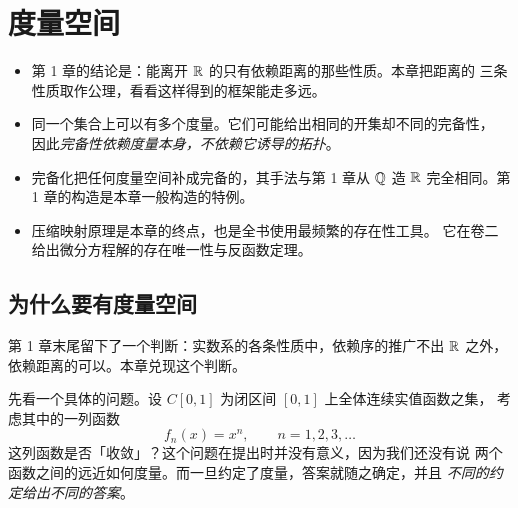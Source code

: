 \chapter{度量空间}
\label{ch:metric}

\begin{keypoint}[本章要点]
  \begin{itemize}
    \item 第 1 章的结论是：能离开 \(\mathbb{R}\) 的只有依赖距离的那些性质。本章把距离的
          三条性质取作公理，看看这样得到的框架能走多远。
    \item 同一个集合上可以有多个度量。它们可能给出相同的开集却不同的完备性，
          因此\emph{完备性依赖度量本身，不依赖它诱导的拓扑}。
    \item 完备化把任何度量空间补成完备的，其手法与第 1 章从 \(\mathbb{Q}\) 造 \(\mathbb{R}\)
          完全相同。第 1 章的构造是本章一般构造的特例。
    \item 压缩映射原理是本章的终点，也是全书使用最频繁的存在性工具。
          它在卷二给出微分方程解的存在唯一性与反函数定理。
  \end{itemize}
\end{keypoint}

\section{为什么要有度量空间}
\label{sec:why-metric}

第 1 章末尾留下了一个判断：实数系的各条性质中，依赖序的推广不出 \(\mathbb{R}\) 之外，依赖距离的可以。本章兑现这个判断。

先看一个具体的问题。设 \(C[0,1]\) 为闭区间 \([0,1]\) 上全体连续实值函数之集，
考虑其中的一列函数
\begin{equation}
  \label{eq:fn-example}
  f_{n}(x) = x^{n}, \qquad n = 1, 2, 3, \dots
\end{equation}
这列函数是否「收敛」？这个问题在提出时并没有意义，因为我们还没有说
两个函数之间的远近如何度量。而一旦约定了度量，答案就随之确定，并且%
\emph{不同的约定给出不同的答案}。

